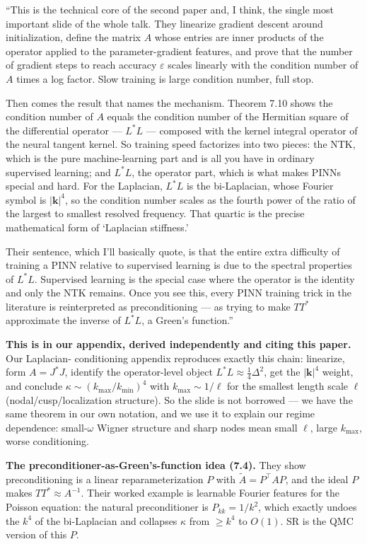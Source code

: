 \documentclass[11pt]{article}
\begin{document}
\begin{say}
``This is the technical core of the second paper and, I think, the single most important slide of the
whole talk. They linearize gradient descent around initialization, define the matrix $A$ whose
entries are inner products of the operator applied to the parameter-gradient features, and prove that
the number of gradient steps to reach accuracy $\varepsilon$ scales linearly with the condition
number of $A$ times a log factor. Slow training is large condition number, full stop.

Then comes the result that names the mechanism. Theorem 7.10 shows the condition number of $A$ equals
the condition number of the Hermitian square of the differential operator --- $L^\ast L$ --- composed
with the kernel integral operator of the neural tangent kernel. So training speed factorizes into two
pieces: the NTK, which is the pure machine-learning part and is all you have in ordinary supervised
learning; and $L^\ast L$, the operator part, which is what makes PINNs special and hard. For the
Laplacian, $L^\ast L$ is the bi-Laplacian, whose Fourier symbol is $|\mathbf k|^4$, so the condition
number scales as the fourth power of the ratio of the largest to smallest resolved frequency. That
quartic is the precise mathematical form of `Laplacian stiffness.'

Their sentence, which I'll basically quote, is that the entire extra difficulty of training a PINN
relative to supervised learning is due to the spectral properties of $L^\ast L$. Supervised learning
is the special case where the operator is the identity and only the NTK remains. Once you see this,
every PINN training trick in the literature is reinterpreted as preconditioning --- as trying to make
$TT^\ast$ approximate the inverse of $L^\ast L$, a Green's function.''
\end{say}

\begin{depth}
\textbf{This is in our appendix, derived independently and citing this paper.} Our Laplacian-
conditioning appendix reproduces exactly this chain: linearize, form $A=J^\ast J$, identify the
operator-level object $L^\ast L\approx\tfrac14\Delta^2$, get the $|\mathbf k|^4$ weight, and conclude
$\kappa\sim(k_{\max}/k_{\min})^4$ with $k_{\max}\sim 1/\ell$ for the smallest length scale $\ell$
(nodal/cusp/localization structure). So the slide is not borrowed --- we have the same theorem in our
own notation, and we use it to explain our regime dependence: small-$\omega$ Wigner structure and
sharp nodes mean small $\ell$, large $k_{\max}$, worse conditioning.

\textbf{The preconditioner-as-Green's-function idea (7.4).} They show preconditioning is a linear
reparameterization $P$ with $\tilde A=P^\top A P$, and the ideal $P$ makes $TT^\ast\approx A^{-1}$.
Their worked example is learnable Fourier features for the Poisson equation: the natural
preconditioner is $P_{kk}=1/k^2$, which exactly undoes the $k^4$ of the bi-Laplacian and collapses
$\kappa$ from $\ge k^4$ to $O(1)$. SR is the QMC version of this $P$.
\end{depth}
\end{document}
